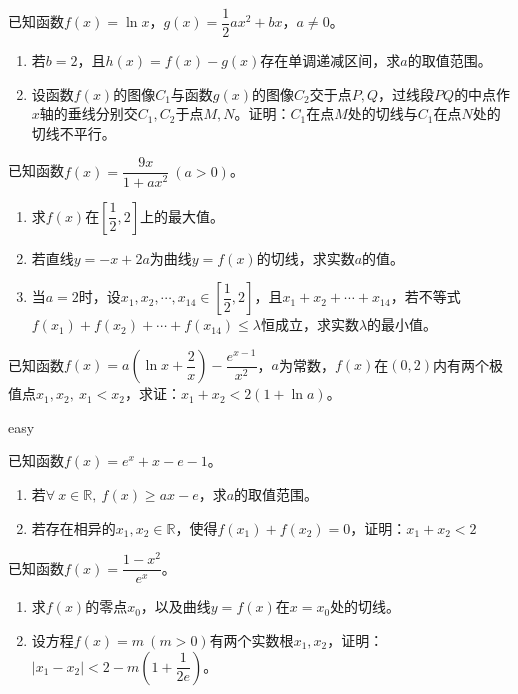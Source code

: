 \begin{que}
	已知函数$f(x)=\ln x$，$g(x)=\dfrac{1}{2}ax^2+bx$，$a\neq 0$。
	\begin{enumerate}
		\item 若$b=2$，且$h(x)=f(x)-g(x)$存在单调递减区间，求$a$的取值范围。
		\item 设函数$f(x)$的图像$C_1$与函数$g(x)$的图像$C_2$交于点$P,Q$，过线段$PQ$的中点作$x$轴的垂线分别交$C_1,C_2$于点$M,N$。证明：$C_1$在点$M$处的切线与$C_1$在点$N$处的切线不平行。
	\end{enumerate}
\end{que}\par\hfill{}\normal

\begin{que}
	已知函数$f(x)=\dfrac{9x}{1+ax^2}\ (a>0)$。
	\begin{enumerate}
		\item 求$f(x)$在$\left[\dfrac{1}{2},2\right]$上的最大值。
		\item 若直线$y=-x+2a$为曲线$y=f(x)$的切线，求实数$a$的值。
		\item 当$a=2$时，设$x_1,x_2,\cdots,x_{14}\in\left[\dfrac{1}{2},2\right]$，且$x_1+x_2+\cdots+x_{14}$，若不等式$f(x_1)+f(x_2)+\cdots+f(x_{14})\leqslant\lambda$恒成立，求实数$\lambda$的最小值。
	\end{enumerate}
\end{que}\par\hfill{}\easy

\begin{que}
	已知函数$f(x)=a\left(\ln x+\dfrac{2}{x}\right)-\dfrac{e^{x-1}}{x^2}$，$a$为常数，$f(x)$在$(0,2)$内有两个极值点$x_1,x_2,\ x_1<x_2$，求证：$x_1+x_2<2(1+\ln a)$。
\end{que}\par\hfill{}easy

\begin{que}
	已知函数$f(x)=e^x+x-e-1$。
	\begin{enumerate}
		\item 若$\forall\ x\in\mathbb{R},\ f(x)\geqslant ax-e$，求$a$的取值范围。
		\item 若存在相异的$x_1,x_2\in\mathbb{R}$，使得$f(x_1)+f(x_2)=0$，证明：$x_1+x_2<2$
	\end{enumerate}
\end{que}\par\hfill{}\easy

\begin{que}
	已知函数$f(x)=\dfrac{1-x^2}{e^x}$。
	\begin{enumerate}
		\item 求$f(x)$的零点$x_0$，以及曲线$y=f(x)$在$x=x_0$处的切线。
		\item 设方程$f(x)=m\ (m>0)$有两个实数根$x_1,x_2$，证明：$|x_1-x_2|<2-m\left(1+\dfrac{1}{2e}\right)$。
	\end{enumerate}
\end{que}\par\hfill{}\easy

